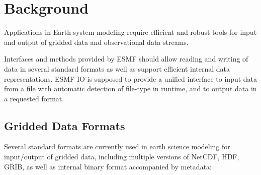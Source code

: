 
\section{Background}

Applications in Earth system modeling require efficient and robust
tools for input and output of gridded data and observational data streams.

Interfaces and methods provided by ESMF should allow reading and
writing of data in several standard formats as well as support
efficient internal data representations. ESMF IO is supposed to
provide a unified interface to input data from a file with automatic 
detection of file-type in runtime, and to output data in a requested format.

\subsection{Gridded Data Formats}

Several standard formats are currently used in earth science modeling
for input/output of gridded data, including multiple versions of
NetCDF, HDF, GRIB, as well as internal binary format accompanied by
metadata:


